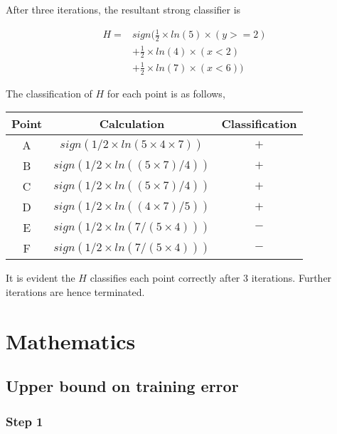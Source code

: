 \documentclass[11pt, a4paper]{article}
\begin{document}
After three iterations, the resultant strong classifier is 

\begin{align*}
	H = & sign(\frac{1}{2} \times ln(5) \times (y>=2) \\ 
	    & + \frac{1}{2} \times ln(4) \times (x<2)     \\ 
	    & + \frac{1}{2} \times ln(7) \times (x<6) )   
\end{align*}

The classification of $H$ for each point is as follows,

\FloatBarrier
\begin{table}[htbp]
	\centering
	\begin{tabular}{|c|c|c|}
		\toprule
		\textbf{Point}   & \textbf{Calculation}                      & \textbf{Classification} \\
		\midrule
		\rule{0pt}{1ex}A & $sign(1/2 \times ln(5\times 4 \times 7))$ & $+$                     \\
		\rule{0pt}{1ex}B & $sign(1/2 \times ln((5 \times 7) / 4))$   & $+$                     \\
		\rule{0pt}{1ex}C & $sign(1/2 \times ln((5 \times 7) / 4))$   & $+$                     \\
		\rule{0pt}{1ex}D & $sign(1/2 \times ln((4 \times 7) / 5))$   & $+$                     \\
		\rule{0pt}{1ex}E & $sign(1/2 \times ln(7 / (5 \times 4)))$   & $-$                     \\
		\rule{0pt}{1ex}F & $sign(1/2 \times ln(7 / (5 \times 4)))$   & $-$                     \\        
		\hline
	\end{tabular}
\end{table}

It is evident the $H$ classifies each point correctly after 3 iterations. Further iterations are hence terminated.

\section{Mathematics}

\subsection{Upper bound on training error}
\subsubsection{Step 1}
\end{document}
